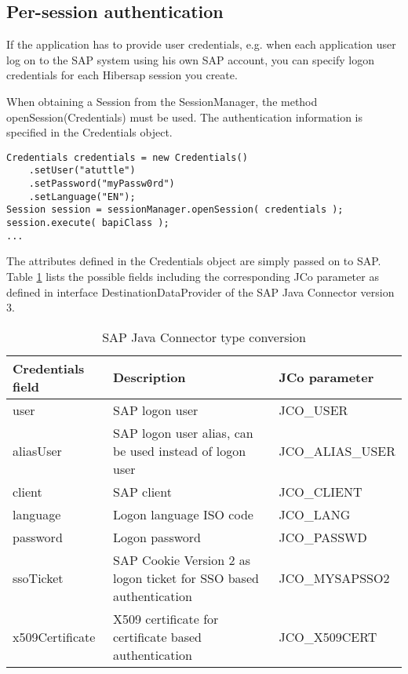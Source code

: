 \subsection{Per-session authentication}
\label{sec:PerSessionAuthentication}

If the application has to provide user credentials, e.g. when each application user log on to the SAP system using his own SAP account, you can specify logon credentials for each Hibersap session you create.

When obtaining a Session from the SessionManager, the method openSession(Credentials) must be used. The authentication information is specified in the Credentials object.

\begin{lstlisting}[caption=Component-managed authentication]
Credentials credentials = new Credentials()
    .setUser("atuttle")
    .setPassword("myPassw0rd")
    .setLanguage("EN");
Session session = sessionManager.openSession( credentials );
session.execute( bapiClass );
...
\end{lstlisting}

The attributes defined in the Credentials object are simply passed on to SAP. Table 
\ref{tab:SAPCredentials} lists the possible fields including the corresponding JCo parameter as defined in interface DestinationDataProvider of the SAP Java Connector version 3.

\begin{table}[H]
  \renewcommand{\arraystretch}{1.5}
  \centering
   \begin{tabularx}{\textwidth}{ l X l }
    \toprule
    \textbf{Credentials field} & \textbf{Description}               & \textbf{JCo parameter} \\ 
    \midrule
    user                       & SAP logon user                     & JCO\_USER \\
    aliasUser                  & SAP logon user alias, can be used 
                                 instead of logon user              & JCO\_ALIAS\_USER \\
    client                     & SAP client                         & JCO\_CLIENT \\
    language                   & Logon language ISO code            & JCO\_LANG \\
    password                   & Logon password                     & JCO\_PASSWD \\
    ssoTicket                  & SAP Cookie Version 2 as logon 
                                 ticket for SSO based 
                                 authentication                     & JCO\_MYSAPSSO2 \\
    x509Certificate            & X509 certificate for certificate 
                                 based authentication               & JCO\_X509CERT \\
    \bottomrule
  \end{tabularx}
  \caption{SAP Java Connector type conversion}
  \label{tab:SAPCredentials}
\end{table}


